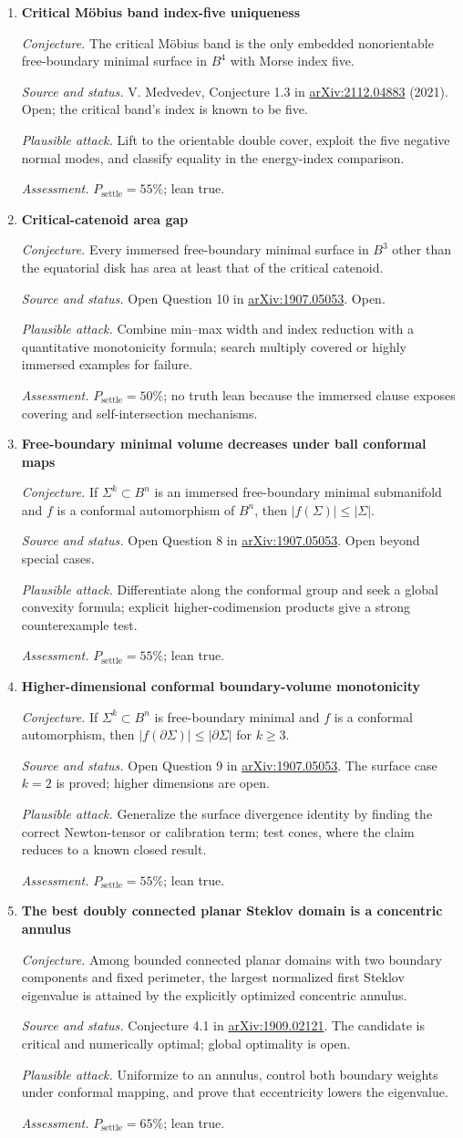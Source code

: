 \documentclass[11pt]{article}
\newcommand{\cand}[5]{%
  \item \textbf{#1}\par
  \emph{Conjecture.} #2\par
  \emph{Source and status.} #3\par
  \emph{Plausible attack.} #4\par
  \emph{Assessment.} #5
}
\newcommand{\psettle}{P_{\mathrm{settle}}}
\begin{document}
\begin{enumerate}[label=\textbf{M\arabic*.}]
\cand{Critical M\"obius band index-five uniqueness}
{The critical M\"obius band is the only embedded nonorientable free-boundary minimal surface in $B^4$ with Morse index five.}
{V. Medvedev, Conjecture 1.3 in \href{https://arxiv.org/abs/2112.04883}{arXiv:2112.04883} (2021).  Open; the critical band's index is known to be five.}
{Lift to the orientable double cover, exploit the five negative normal modes, and classify equality in the energy-index comparison.}
{$\psettle=55\%$; lean true.}

\cand{Critical-catenoid area gap}
{Every immersed free-boundary minimal surface in $B^3$ other than the equatorial disk has area at least that of the critical catenoid.}
{Open Question 10 in \href{https://arxiv.org/abs/1907.05053}{arXiv:1907.05053}.  Open.}
{Combine min--max width and index reduction with a quantitative monotonicity formula; search multiply covered or highly immersed examples for failure.}
{$\psettle=50\%$; no truth lean because the immersed clause exposes covering and self-intersection mechanisms.}

\cand{Free-boundary minimal volume decreases under ball conformal maps}
{If $\Sigma^k\subset B^n$ is an immersed free-boundary minimal submanifold and $f$ is a conformal automorphism of $B^n$, then $|f(\Sigma)|\le|\Sigma|$.}
{Open Question 8 in \href{https://arxiv.org/abs/1907.05053}{arXiv:1907.05053}.  Open beyond special cases.}
{Differentiate along the conformal group and seek a global convexity formula; explicit higher-codimension products give a strong counterexample test.}
{$\psettle=55\%$; lean true.}

\cand{Higher-dimensional conformal boundary-volume monotonicity}
{If $\Sigma^k\subset B^n$ is free-boundary minimal and $f$ is a conformal automorphism, then $|f(\partial\Sigma)|\le|\partial\Sigma|$ for $k\ge3$.}
{Open Question 9 in \href{https://arxiv.org/abs/1907.05053}{arXiv:1907.05053}.  The surface case $k=2$ is proved; higher dimensions are open.}
{Generalize the surface divergence identity by finding the correct Newton-tensor or calibration term; test cones, where the claim reduces to a known closed result.}
{$\psettle=55\%$; lean true.}

\cand{The best doubly connected planar Steklov domain is a concentric annulus}
{Among bounded connected planar domains with two boundary components and fixed perimeter, the largest normalized first Steklov eigenvalue is attained by the explicitly optimized concentric annulus.}
{Conjecture 4.1 in \href{https://arxiv.org/abs/1909.02121}{arXiv:1909.02121}.  The candidate is critical and numerically optimal; global optimality is open.}
{Uniformize to an annulus, control both boundary weights under conformal mapping, and prove that eccentricity lowers the eigenvalue.}
{$\psettle=65\%$; lean true.}


\end{enumerate}
\end{document}
